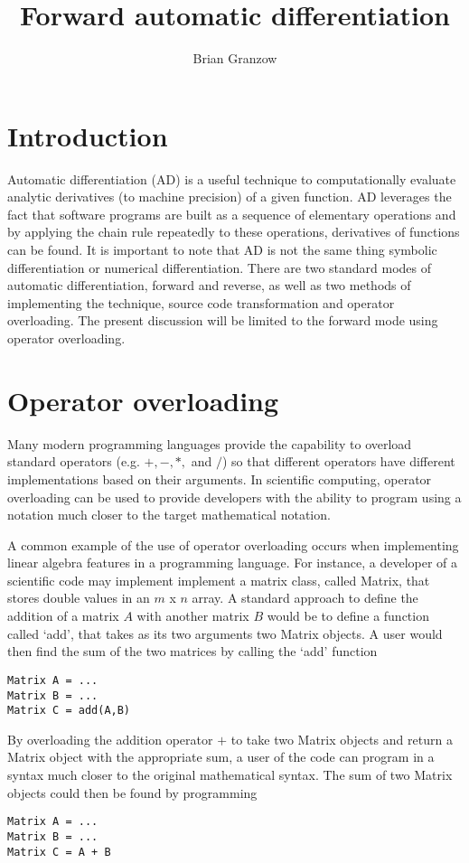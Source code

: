 \documentclass{article}
\title{Forward automatic differentiation}
\author{Brian Granzow}
\begin{document}
\maketitle

\section{Introduction}

Automatic differentiation (AD) is a useful technique to computationally
evaluate analytic derivatives (to machine precision) of a given function.
AD leverages the fact that software programs are built as a sequence of
elementary operations and by applying the chain rule repeatedly to
these operations, derivatives of functions can be found. It is important to
note that AD is not the same thing symbolic differentiation or numerical
differentiation. There are two standard modes of automatic differentiation,
forward and reverse, as well as two methods of implementing the technique,
source code transformation and operator overloading. The present discussion
will be limited to the forward mode using operator overloading.

\section{Operator overloading}
Many modern programming languages provide the capability to overload
standard operators (e.g. $+, -, *,$ and $/$) so that different operators
have different implementations based on their arguments. In scientific
computing, operator overloading can be used to provide developers with the
ability to program using a notation much closer to the target mathematical
notation.

A common example of the use of operator overloading occurs when implementing
linear algebra features in a programming language. For instance, a developer
of a scientific code may implement implement a matrix class, called Matrix,
that stores double values in an $m$ x $n$ array. A standard approach to define
the addition of a matrix $A$ with another matrix $B$ would be to define a
function called `add', that takes as its two arguments two Matrix objects.
A user would then find the sum of the two matrices by calling the `add'
function
\begin{lstlisting}
Matrix A = ...
Matrix B = ...
Matrix C = add(A,B)
\end{lstlisting}

By overloading the addition operator $+$ to take two Matrix objects and
return a Matrix object with the appropriate sum, a user of the code can
program in a syntax much closer to the original mathematical syntax. The
sum of two Matrix objects could then be found by programming
\begin{lstlisting}
Matrix A = ...
Matrix B = ...
Matrix C = A + B
\end{lstlisting}
\end{document}
